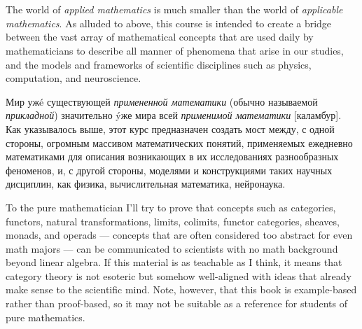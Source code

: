 \documentclass[CT4S-EN-RU]{subfiles}
\begin{document}
\section{}

\begin{blockENG}
The world of {\em applied mathematics} is much smaller than the world of {\em applicable mathematics}. As alluded to above, this course is intended to create a bridge between the vast array of mathematical concepts that are used daily by mathematicians to describe all manner of phenomena that arise in our studies, and the models and frameworks of scientific disciplines such as physics, computation, and neuroscience.
\end{blockENG}

\begin{blockRUS}
Мир уж\'e существующей {\em примененной математики} (обычно называемой {\em прикладной}) значительно \'yже мира всей {\em применимой математики} [каламбур].%
 Как указывалось выше, этот курс предназначен создать мост между, с одной стороны, огромным массивом математических понятий, применяемых ежедневно математиками для описания возникающих в их исследованиях разнообразных феноменов, и, с другой стороны, моделями и конструкциями таких научных дисциплин, как физика, вычислительная математика, нейронаука. 
\end{blockRUS}

\begin{blockENG}
To the pure mathematician I'll try to prove that concepts such as categories, functors, natural transformations, limits, colimits, functor categories, sheaves, monads, and operads — concepts that are often considered too abstract for even math majors — can be communicated to scientists with no math background beyond linear algebra. If this material is as teachable as I think, it means that category theory is not esoteric but somehow well-aligned with ideas that already make sense to the scientific mind. Note, however, that this book is example-based rather than proof-based, so it may not be suitable as a reference for students of pure mathematics.
\end{blockENG}
\end{document}
